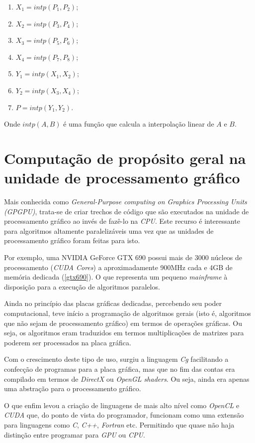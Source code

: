     \begin{enumerate}
      \item $X_{1} = intp(P_{1}, P_{2})$;
      \item $X_{2} = intp(P_{3}, P_{4})$;
      \item $X_{3} = intp(P_{5}, P_{6})$;
      \item $X_{4} = intp(P_{7}, P_{8})$;
      \item $Y_{1} = intp(X_{1}, X_{2})$;
      \item $Y_{2} = intp(X_{3}, X_{4})$;
      \item $P = intp(Y_{1}, Y_{2})$.
    \end{enumerate}
    
    Onde $intp(A,B)$ é uma função que calcula a interpolação linear de $A$ e $B$.

\section{Computação de propósito geral na unidade de processamento gráfico}
\label{gpgpu}
Mais conhecida como \textit{General-Purpose computing on Graphics Processing Units (GPGPU)}, trata-se de  criar trechos de código que são executados na unidade de processamento gráfico ao invés de fazê-lo na \textit{CPU}. Este recurso é interessante para algoritmos altamente paralelizáveis uma vez que as unidades de processamento gráfico foram feitas para isto.

Por exemplo, uma NVIDIA GeForce GTX 690 possui mais de 3000 núcleos de processamento (\textit{CUDA Cores}) a aproximadamente 900MHz cada e 4GB de memória dedicada (\ref{gtx690}). O que representa um pequeno \textit{mainframe} à disposição para a execução de algoritmos paralelos. 

Ainda no princípio das placas gráficas dedicadas, percebendo seu poder computacional, teve início a programação de algoritmos gerais (isto é, algoritmos que não sejam de processamento gráfico) em termos de operações gráficas. Ou seja, os algoritmos eram traduzidos em termos multiplicações de matrizes para poderem ser processados na placa gráfica.

Com o crescimento deste tipo de uso, surgiu a linguagem \textit{Cg} facilitando a confecção de programas para a placa gráfica, mas que no fim das contas era compilado em termos de \textit{DirectX} ou \textit{OpenGL shaders}. Ou seja, ainda era apenas uma abstração para o processamento gráfico.

O que enfim levou a criação de linguagens de mais alto nível como \textit{OpenCL} e \textit{CUDA} que, do ponto de vista do programador, funcionam como uma extensão para linguagens como \textit{C}, \textit{C++}, \textit{Fortran} etc. Permitindo que quase não haja distinção entre programar para \textit{GPU} ou \textit{CPU}.

